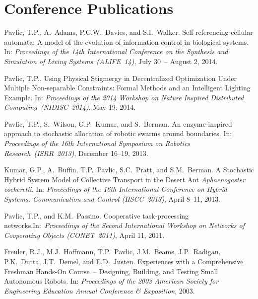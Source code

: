 \section{Conference Publications}

\begin{bibenum}

    \item Pavlic, T.P., A.~Adams, P.C.W.~Davies, and S.I.~Walker.
        Self-referencing cellular automata: A model of the evolution of
        information control in biological systems.
        In: \emph{Proceedings of the 14th International Conference on
        the Synthesis and Simulation of Living Systems~(ALIFE~14)},
        July 30~-- August 2, 2014.\\

    \item Pavlic, T.P.. Using Physical Stigmergy in Decentralized
        Optimization Under Multiple Non-separable Constraints: Formal
        Methods and an Intelligent Lighting Example. In:
        \emph{Proceedings of the 2014 Workshop on Nature Inspired
        Distributed Computing~(NIDISC~2014)}, May 19, 2014.

    \item Pavlic, T.P., S.~Wilson, G.P.~Kumar, and S.~Berman.
        An enzyme-inspired approach to stochastic allocation of robotic
        swarms around boundaries. In: \emph{Proceedings of the 16th
        International Symposium on Robotics Research~(ISRR~2013)},
        December 16--19, 2013.

    \item Kumar, G.P., A.~Buffin, T.P.~Pavlic, S.C.~Pratt, and
        S.M.~Berman. A Stochastic Hybrid System Model of Collective
        Transport in the Desert Ant \emph{Aphaenogaster cockerelli}. In:
        \emph{Proceedings of the 16th International Conference on Hybrid
        Systems: Communication and Control (HSCC~2013)}, April 8--11,
        2013. 

    \item Pavlic, T.P., and K.M.~Passino. Cooperative task-processing
        networks.\linebreak[4] In:~\emph{Proceedings of the Second
        International Workshop on Networks of Cooperating
        Objects (CONET~2011)}, April 11, 2011.

    \item Freuler, R.J., M.J.~Hoffmann, T.P.~Pavlic, J.M.~Beams,
        J.P.~Radigan, P.K.~Dutta, J.T.~Demel, and E.D.~Justen.
        Experiences with a Comprehensive Freshman Hands-On Course~--
        Designing, Building, and Testing Small Autonomous Robots. In:
        \emph{Proceedings of the 2003 American Society for Engineering
        Education Annual Conference \& Exposition}, 2003.

\end{bibenum}
